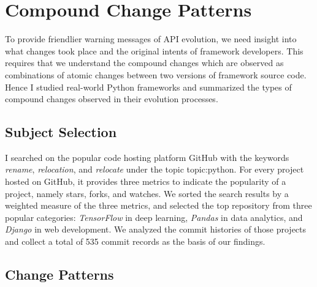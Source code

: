\chapter{Compound Change Patterns}
\label{chap:compound-changes}

To provide friendlier warning messages of API evolution, we need insight into what changes took place and the original intents of framework developers. This requires that we understand the compound changes which are observed as combinations of atomic changes between two versions of framework source code. Hence I studied real-world Python frameworks and summarized the types of compound changes observed in their evolution processes.

\section{Subject Selection}

I searched on the popular code hosting platform GitHub with the keywords \textit{rename}, \textit{relocation}, and \textit{relocate} under the topic topic:python. For every project hosted on GitHub, it provides three metrics to indicate the popularity of a project, namely stars, forks, and watches. We sorted the search results by a weighted measure of the three metrics, and selected the top repository from three popular categories: \textit{TensorFlow} in deep learning, \textit{Pandas} in data analytics, and \textit{Django} in web development. We analyzed the commit histories of those projects and collect a total of 535 commit records as the basis of our findings.

\section{Change Patterns}

